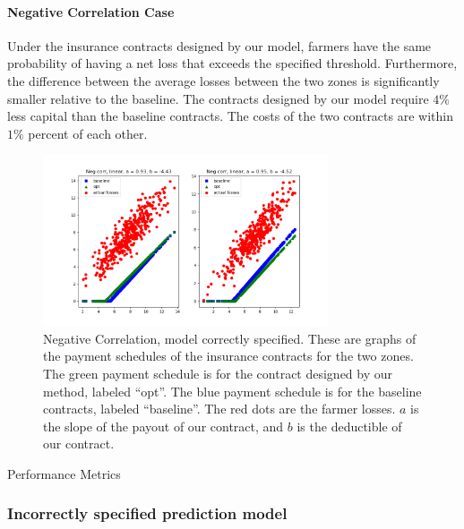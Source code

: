 \documentclass[11pt]{article}
\begin{document}
      \paragraph{Negative Correlation Case} Under the insurance contracts designed by our model, farmers have the same probability of having a net loss that exceeds the specified threshold. Furthermore, the difference between the average losses between the two zones is significantly smaller relative to the baseline. The contracts designed by our model require $4\%$ less capital than the baseline contracts. The costs of the two contracts are within $1\%$ percent of each other. 
      \begin{figure}[H]
          \centering
          \includegraphics[width=0.75\textwidth]{../../output/figures/Exploration/neg_correlation_linear.png}
          \caption{Negative Correlation, model correctly specified. These are graphs of the payment schedules of the insurance contracts for the two zones. The green payment schedule is for the contract designed by our method, labeled ``opt''. The blue payment schedule is for the baseline contracts, labeled ``baseline''. The red dots are the farmer losses. $a$ is the slope of the payout of our contract, and $b$ is the deductible of our contract.}
      \end{figure}

      \begin{table}[H]
          \centering
          \small
          \caption{Performance Metrics}
          
      \end{table}
      \FloatBarrier

    \subsubsection{Incorrectly specified prediction model}
\end{document}
